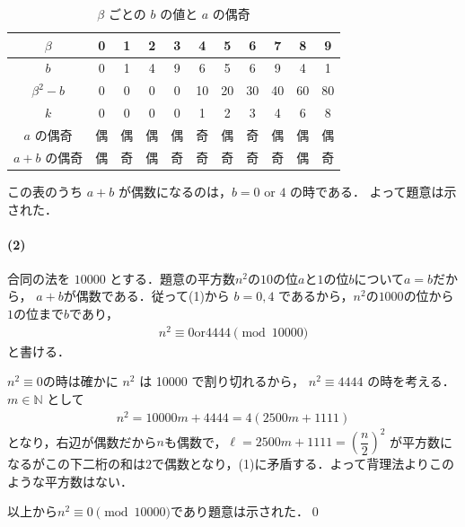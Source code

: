 \documentclass[../../main.tex]{subfiles}
\begin{document}
\begin{table}[htb]
  \centering
  \caption{$\beta$ ごとの $b$ の値と $a$ の偶奇}
  \begin{tabular}{|c|c|c|c|c|c|c|c|c|c|c|} \hline
    $\beta$      & 0  & 1  & 2  & 3  & 4  & 5  & 6  & 7  & 8  & 9 \\  \hline
    $b$          & 0  & 1  & 4  & 9  & 6  & 5  & 6  & 9  & 4  & 1 \\  \hline
    $\beta^2-b$  & 0  & 0  & 0  & 0  & 10 & 20 & 30 & 40 & 60 & 80 \\ \hline
    $k$          & 0  & 0  & 0  & 0  & 1  & 2  & 3  & 4  & 6  & 8  \\ \hline
    $a$ の偶奇   & 偶 & 偶 & 偶 & 偶 & 奇 & 偶 & 奇 & 偶 & 偶 & 偶 \\ \hline
    $a+b$ の偶奇 & 偶 & 奇 & 偶 & 奇 & 奇 & 奇 & 奇 & 奇 & 偶 & 奇 \\ \hline
  \end{tabular}
\end{table}

この表のうち $a+b$ が偶数になるのは，$b = 0$ or $4$ の時である．
よって題意は示された．

\paragraph{(2)}

合同の法を $10000$ とする．題意の平方数$n^2$の$10$の位$a$と$1$の位$b$について$a=b$だから，
$a+b$が偶数である．従って(1)から $b=0,4$ であるから，$n^2$の$1000$の位から$1$の位まで$b$であり，
\begin{align}
  n^2 \equiv 0 \text{or} 4444 \pmod{10000} \label{eq:7}
\end{align}
と書ける．

$n^2 \equiv 0$の時は確かに $n^2$ は 10000 で割り切れるから，
$n^2 \equiv 4444$ の時を考える．
$m \in \mathbb{N}$ として
\begin{align}
  n^2 = 10000 m + 4444 = 4(2500 m + 1111)
\end{align}
となり，右辺が偶数だから$n$も偶数で，$\ell=2500m + 1111=\left(\dfrac{n}{2}\right)^2$ が平方数になるがこの下二桁の和は$2$で偶数となり，(1)に矛盾する．よって背理法よりこのような平方数はない．

以上から$n^2 \equiv 0 \pmod{10000}$であり題意は示された．\qed
\end{document}
